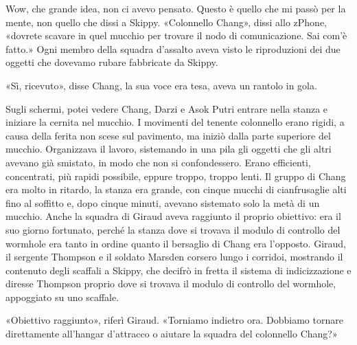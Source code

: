 Wow, che grande idea, non ci avevo pensato. Questo è quello che mi passò
per la mente, non quello che dissi a Skippy. «Colonnello Chang», dissi
allo zPhone, «dovrete scavare in quel mucchio per trovare il nodo di
comunicazione. Sai com'è fatto.» Ogni membro della squadra d'assalto
aveva visto le riproduzioni dei due oggetti che dovevamo rubare
fabbricate da Skippy.

«Sì, ricevuto», disse Chang, la sua voce era tesa, aveva un rantolo in
gola.

Sugli schermi, potei vedere Chang, Darzi e Asok Putri entrare nella
stanza e iniziare la cernita nel mucchio. I movimenti del tenente
colonnello erano rigidi, a causa della ferita non scese sul pavimento,
ma iniziò dalla parte superiore del mucchio. Organizzava il lavoro,
sistemando in una pila gli oggetti che gli altri avevano già smistato,
in modo che non si confondessero. Erano efficienti, concentrati, più
rapidi possibile, eppure troppo, troppo lenti. Il gruppo di Chang era
molto in ritardo, la stanza era grande, con cinque mucchi di
cianfrusaglie alti fino al soffitto e, dopo cinque minuti, avevano
sistemato solo la metà di un mucchio. Anche la squadra di Giraud aveva
raggiunto il proprio obiettivo: era il suo giorno fortunato, perché la
stanza dove si trovava il modulo di controllo del wormhole era tanto in
ordine quanto il bersaglio di Chang era l'opposto. Giraud, il sergente
Thompson e il soldato Marsden corsero lungo i corridoi, mostrando il
contenuto degli scaffali a Skippy, che decifrò in fretta il sistema di
indicizzazione e diresse Thompson proprio dove si trovava il modulo di
controllo del wormhole, appoggiato su uno scaffale.

«Obiettivo raggiunto», riferì Giraud. «Torniamo indietro ora. Dobbiamo
tornare direttamente all'hangar d'attracco o aiutare la squadra del
colonnello Chang?»

